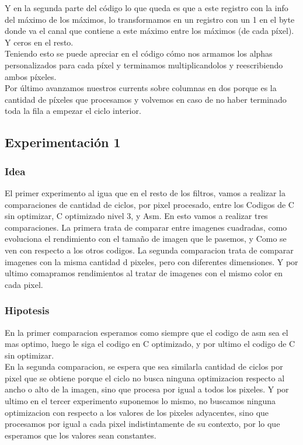 	
	
   Y en la segunda parte del código lo que queda es que a este registro con la info del máximo de los máximos, lo transformamos en un registro con un 1 en el byte donde va el canal que contiene a este máximo entre los máximos (de cada píxel). Y ceros en el resto. \\ Teniendo esto se puede apreciar en el código cómo nos armamos los alphas personalizados para cada píxel y terminamos multiplicandolos y reescribiendo ambos píxeles. \\
   Por último avanzamos nuestros currents sobre columnas en dos porque es la cantidad de píxeles que procesamos y  volvemos en caso de no haber terminado toda la fila a empezar el ciclo interior.
	
	
\subsection{Experimentación 1}

\subsubsection{Idea}
	El primer experimento al igua que en el resto de los filtros, vamos a realizar la comparaciones 
	de cantidad de ciclos, por pixel procesado,  entre los Codigos de C sin optimizar, C optimizado nivel 3, y Asm. En esto vamos a realizar tres comparaciones. La primera trata de comparar entre imagenes cuadradas, como evoluciona el rendimiento con el tamaño de imagen que le pasemos, y Como se ven con respecto a los otros codigos. La segunda comparacion trata de comparar imagenes con la misma cantidad d pixeles, pero con diferentes dimensiones. Y por ultimo comapramos rendimientos al tratar de imagenes con el mismo color en cada pixel.
	
	
\subsubsection{Hipotesis}
	En la primer comparacion esperamos como siempre que el codigo de asm sea el mas optimo, luego le siga el codigo en C optimizado, y por ultimo el codigo de C sin optimizar. \\ 
	En la segunda comparacion, se espera que sea similarla cantidad de ciclos por pixel que se obtiene porque el ciclo no busca ninguna optimizacion respecto al ancho o alto de la imagen, sino que procesa por igual a todos los pixeles.
	Y por ultimo en el tercer experimento suponemos lo mismo, no buscamos ninguna optimizacion con respecto a los valores de los pixeles adyacentes, sino que procesamos por igual a cada pixel indistintamente de su contexto, por lo que esperamos que los valores sean constantes.
	

